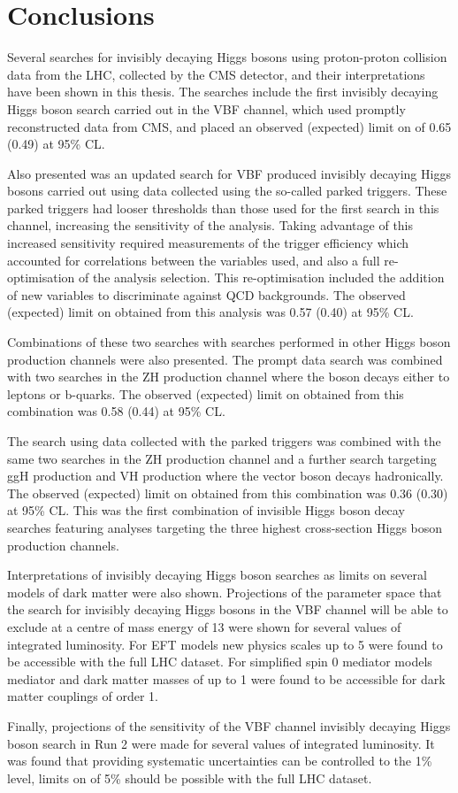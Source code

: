 \chapter{Conclusions}
\label{chap:conclusions}
Several searches for invisibly decaying Higgs bosons using proton-proton collision data from the LHC, collected by the CMS detector, and their interpretations have been shown in this thesis. The searches include the first invisibly decaying Higgs boson search carried out in the \ac{VBF} channel, which used promptly reconstructed data from CMS, and placed an observed (expected) limit on \BRinv of 0.65 (0.49) at 95\% \ac{CL}.

Also presented was an updated search for \ac{VBF} produced invisibly decaying Higgs bosons carried out using data collected using the so-called parked triggers. These parked triggers had looser thresholds than those used for the first search in this channel, increasing the sensitivity of the analysis. Taking advantage of this increased sensitivity required measurements of the trigger efficiency which accounted for correlations between the variables used, and also a full re-optimisation of the analysis selection. This re-optimisation included the addition of new variables to discriminate against \ac{QCD} backgrounds. The observed (expected) limit on \BRinv obtained from this analysis was 0.57 (0.40) at 95\% \ac{CL}.

Combinations of these two searches with searches performed in other Higgs boson production channels were also presented. The prompt data search was combined with two searches in the ZH production channel where the \PZ boson decays either to leptons or b-quarks. The observed (expected) limit on \BRinv obtained from this combination was 0.58 (0.44) at 95\% \ac{CL}.

The search using data collected with the parked triggers was combined with the same two searches in the ZH production channel and a further search targeting \ac{ggH} production and VH production where the vector boson decays hadronically. The observed (expected) limit on \BRinv obtained from this combination was 0.36 (0.30) at 95\% \ac{CL}. This was the first combination of invisible Higgs boson decay searches featuring analyses targeting the three highest cross-section Higgs boson production channels.

Interpretations of invisibly decaying Higgs boson searches as limits on several models of dark matter were also shown. Projections of the parameter space that the search for invisibly decaying Higgs bosons in the \ac{VBF} channel will be able to exclude at a centre of mass energy of 13 \TeV were shown for several values of integrated luminosity. For \ac{EFT} models new physics scales up to 5 \TeV were found to be accessible with the full LHC dataset. For simplified spin 0 mediator models mediator and dark matter masses of up to 1 \TeV were found to be accessible for dark matter couplings of order 1.

Finally, projections of the sensitivity of the \ac{VBF} channel invisibly decaying Higgs boson search in Run 2 were made for several values of integrated luminosity. It was found that providing systematic uncertainties can be controlled to the 1\% level, limits on \BRinv of 5\% should be possible with the full LHC dataset.
